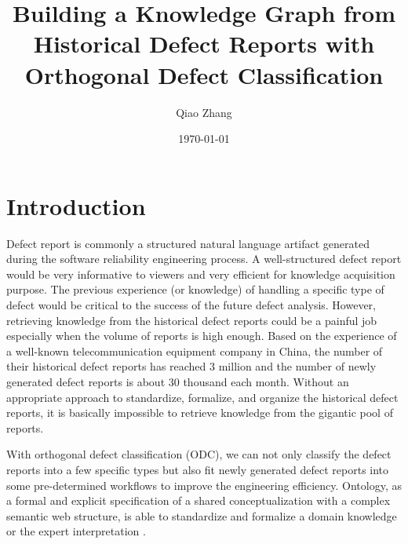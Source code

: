 \documentclass[12pt] {article}
\begin{document}
\title{Building a Knowledge Graph from Historical Defect Reports with Orthogonal Defect Classification}
\author{Qiao Zhang}
\date \today
\maketitle

\thispagestyle{empty}

\bigskip
\pagebreak
\setcounter{page}{1}
\section{Introduction}
Defect report is commonly a structured natural language artifact generated during the software reliability engineering process.
A well-structured defect report would be very informative to viewers and very efficient for knowledge acquisition purpose.
The previous experience (or knowledge) of handling a specific type of defect would be critical to the success of the future defect analysis.
However, retrieving knowledge from the historical defect reports could be a painful job especially when the volume of reports is high enough.
Based on the experience of a well-known telecommunication equipment company in China, the number of their historical defect reports has reached 3 million and the number of newly generated defect reports is about 30 thousand each month.
Without an appropriate approach to standardize, formalize, and organize the historical defect reports, it is basically impossible to retrieve knowledge from the gigantic pool of reports.\par

With orthogonal defect classification (ODC), we can not only classify the defect reports into a few specific types but also fit newly generated defect reports into some pre-determined workflows to improve the engineering efficiency.
Ontology, as a formal and explicit specification of a shared conceptualization with a complex semantic web structure, is able to standardize and formalize a domain knowledge or the expert interpretation \cite{christina2016an}.



\pagebreak
\end{document}
